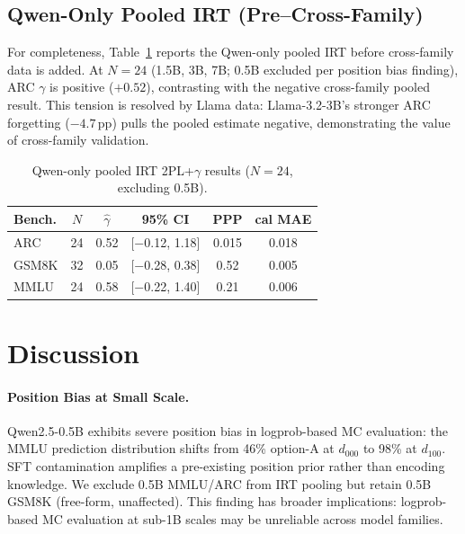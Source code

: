 \documentclass[11pt,a4paper]{article}
\newcommand{\ghat}{\hat{\gamma}}
\newcommand{\pp}{\,\text{pp}}
\begin{document}
\subsection{Qwen-Only Pooled IRT (Pre--Cross-Family)}

For completeness, Table~\ref{tab:qwen_irt} reports the Qwen-only pooled IRT before cross-family data is added. At $N\!=\!24$ (1.5B, 3B, 7B; 0.5B excluded per position bias finding), ARC $\gamma$ is positive ($+0.52$), contrasting with the negative cross-family pooled result. This tension is resolved by Llama data: Llama-3.2-3B's stronger ARC forgetting ($-4.7\pp$) pulls the pooled estimate negative, demonstrating the value of cross-family validation.

\begin{table}[t]
\centering
\small
\caption{Qwen-only pooled IRT 2PL+$\gamma$ results ($N\!=\!24$, excluding 0.5B).}
\label{tab:qwen_irt}
\begin{tabular}{lccccc}
\toprule
\textbf{Bench.} & $N$ & $\ghat$ & \textbf{95\% CI} & \textbf{PPP} & \textbf{cal MAE} \\
\midrule
ARC & 24 & 0.52 & [$-$0.12, 1.18] & 0.015 & 0.018 \\
GSM8K & 32 & 0.05 & [$-$0.28, 0.38] & 0.52 & 0.005 \\
MMLU & 24 & 0.58 & [$-$0.22, 1.40] & 0.21 & 0.006 \\
\bottomrule
\end{tabular}
\end{table}

\section{Discussion}
\label{sec:discussion}

\paragraph{Position Bias at Small Scale.}
Qwen2.5-0.5B exhibits severe position bias in logprob-based MC evaluation: the MMLU prediction distribution shifts from 46\% option-A at $d_{000}$ to 98\% at $d_{100}$. SFT contamination amplifies a pre-existing position prior rather than encoding knowledge. We exclude 0.5B MMLU/ARC from IRT pooling but retain 0.5B GSM8K (free-form, unaffected). This finding has broader implications: logprob-based MC evaluation at sub-1B scales may be unreliable across model families.
\end{document}
